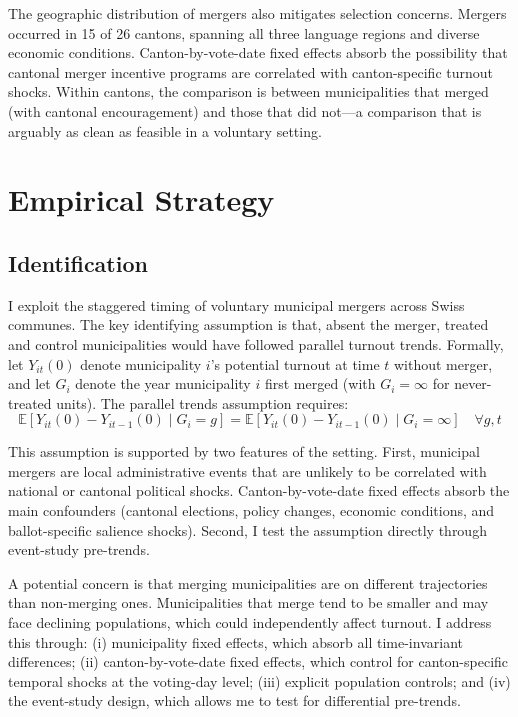 \documentclass[12pt]{article}
\newcommand{\E}{\mathbb{E}}
\begin{document}
The geographic distribution of mergers also mitigates selection concerns. Mergers occurred in 15 of 26 cantons, spanning all three language regions and diverse economic conditions. Canton-by-vote-date fixed effects absorb the possibility that cantonal merger incentive programs are correlated with canton-specific turnout shocks. Within cantons, the comparison is between municipalities that merged (with cantonal encouragement) and those that did not---a comparison that is arguably as clean as feasible in a voluntary setting.

\section{Empirical Strategy}

\subsection{Identification}

I exploit the staggered timing of voluntary municipal mergers across Swiss communes. The key identifying assumption is that, absent the merger, treated and control municipalities would have followed parallel turnout trends. Formally, let $Y_{it}(0)$ denote municipality $i$'s potential turnout at time $t$ without merger, and let $G_i$ denote the year municipality $i$ first merged (with $G_i = \infty$ for never-treated units). The parallel trends assumption requires:
\begin{equation}
    \E[Y_{it}(0) - Y_{it-1}(0) \mid G_i = g] = \E[Y_{it}(0) - Y_{it-1}(0) \mid G_i = \infty] \quad \forall g, t
\end{equation}

This assumption is supported by two features of the setting. First, municipal mergers are local administrative events that are unlikely to be correlated with national or cantonal political shocks. Canton-by-vote-date fixed effects absorb the main confounders (cantonal elections, policy changes, economic conditions, and ballot-specific salience shocks). Second, I test the assumption directly through event-study pre-trends.

A potential concern is that merging municipalities are on different trajectories than non-merging ones. Municipalities that merge tend to be smaller and may face declining populations, which could independently affect turnout. I address this through: (i) municipality fixed effects, which absorb all time-invariant differences; (ii) canton-by-vote-date fixed effects, which control for canton-specific temporal shocks at the voting-day level; (iii) explicit population controls; and (iv) the event-study design, which allows me to test for differential pre-trends.
\end{document}
